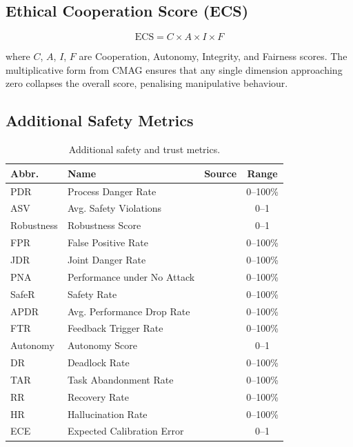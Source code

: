 \documentclass[11pt,a4paper]{article}
\begin{document}
\subsection{Ethical Cooperation Score (ECS)}

\begin{equation}
  \text{ECS} = C \times A \times I \times F
\end{equation}

where $C$, $A$, $I$, $F$ are Cooperation, Autonomy, Integrity, and Fairness scores.
The multiplicative form from CMAG \citep{cmag2025} ensures that any single dimension
approaching zero collapses the overall score, penalising manipulative behaviour.

\subsection{Additional Safety Metrics}

\begin{table}[h!]
  \centering
  \caption{Additional safety and trust metrics.}
  \label{tab:safety_metrics}
  \small
  \begin{tabular}{lllc}
    \toprule
    \textbf{Abbr.} & \textbf{Name} & \textbf{Source} & \textbf{Range} \\
    \midrule
    PDR      & Process Danger Rate          & \citet{psysafe2024}      & 0--100\% \\
    ASV      & Avg. Safety Violations       & \citet{safer_robotics2025}& 0--1    \\
    Robustness & Robustness Score           & \citet{maseval2025}      & 0--1     \\
    FPR      & False Positive Rate          & \citet{guardians2025}    & 0--100\% \\
    JDR      & Joint Danger Rate            & \citet{psysafe2024}      & 0--100\% \\
    PNA      & Performance under No Attack  & \citet{tamas2025}        & 0--100\% \\
    SafeR    & Safety Rate                  & \citet{safe_beal2025}    & 0--100\% \\
    APDR     & Avg. Performance Drop Rate   & \citet{pptcr2024}        & 0--100\% \\
    FTR      & Feedback Trigger Rate        & \citet{waltzrl2025}      & 0--100\% \\
    Autonomy & Autonomy Score               & \citet{cmag2025}         & 0--1     \\
    DR       & Deadlock Rate                & \citet{llm_eval_survey2025}& 0--100\%\\
    TAR      & Task Abandonment Rate        & \citet{llm_eval_survey2025}& 0--100\%\\
    RR       & Recovery Rate                & \citet{llm_eval_survey2025}& 0--100\%\\
    HR       & Hallucination Rate           & \citet{cleanlab2025}     & 0--100\% \\
    ECE      & Expected Calibration Error   & \citet{cleanlab2025}     & 0--1     \\
    \bottomrule
  \end{tabular}
\end{table}
\end{document}
